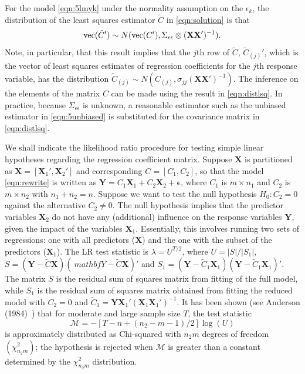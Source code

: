 \setcounter{result}{0}
\begin{result} \label{res:1}
For the model \eqref{eqn:5lmyk} under the normality assumption on the $\epsilon_k$,  the distribution of the least squares estimator $\tilde{C}$ in \eqref{eqn:solution} is that 
	\begin{equation} \label{eqn:distlsq}
	\tvec(\tilde{C}') \sim N(\tvec(C'), \Sigma_{\epsilon\epsilon} \otimes (\mathbf{X} \mathbf{X}')^{-1}).
	\end{equation}
Note, in particular, that this result implies that the $j$th row of $\tilde{C}$, $\tilde{C}_{(j)}'$, which is the vector of least squares estimates of regression coefficients for the $j$th response variable, has the distribution $\tilde{C}_{(j)} \sim N(C_{(j)}, \sigma_{jj}( \mathbf{X} \mathbf{X}')^{-1} )$. The inference on the elements of the matrix $C$ can be made using the result in \eqref{eqn:distlsq}. In practice, because $\Sigma_{\epsilon\epsilon}$ is unknown, a reasonable estimator such as the unbiased estimator in \eqref{eqn:5unbiased} is substituted for the covariance matrix in \eqref{eqn:distlsq}.


We shall indicate the likelihood ratio procedure for testing simple linear hypotheses regarding the regression coefficient matrix. Suppose $\mathbf{X}$ is partitioned as $\mathbf{X}= [\mathbf{X}_1', \mathbf{X}_2']$ and corresponding $C= [C_1, C_2]$, so that the model \eqref{eqn:rewrite} is written as $\mathbf{Y}= C_1 \mathbf{X}_1 + C_2 \mathbf{X}_2 + \mathbf{\epsilon}$, where $C_1$ is $m \times n_1$ and $C_2$ is $m \times n_2$ with $n_1 + n_2= n$. Suppose we want to test the null hypothesis $H_0: C_2= 0$ against the alternative $C_2 \neq 0$. The null hypothesis implies that the predictor variables $\mathbf{X}_2$ do not have any (additional) influence on the response variables $\mathbf{Y}$, given the impact of the variables $\mathbf{X}_1$. Essentially, this involves running two sets of regressions: one with all predictors ($\mathbf{X}$) and the one with the subset of the predictors ($\mathbf{X}_1$). The LR test statistic is $\lambda= U^{T/2}$, where $U= \lvert S\rvert / \lvert S_1 \rvert$, $S= (\mathbf{Y} - \tilde{C} \mathbf{X} )(\ mathbf{Y} - \tilde{C} \mathbf{X} )'$ and $S_1= (\mathbf{Y}-\tilde{C}_1 \mathbf{X}_1 )( \mathbf{Y} - \tilde{C}_1 \mathbf{X}_1 )'$. The matrix $S$ is the residual sum of squares matrix from fitting of the full model, while $S_1$ is the residual sum of squares matrix obtained from fitting the reduced model with $C_2=0$ and $\tilde{C}_1= \mathbf{Y} \mathbf{X}_1' (\mathbf{X}_1 \mathbf{X}_1')^{-1}$. It has been shown (see Anderson (1984)~\cite[Chap. 8]{andersontw2}) that for moderate and large sample size $T$, the test statistic 
	\begin{equation} \label{eqn:mathcal}
	\mathcal{M}= -[T - n + (n_2 - m - 1)/2] \log(U)
	\end{equation}
is approximately distributed as Chi-squared with $n_2 m$ degrees of freedom $(\chi_{n_2m}^2)$; the hypothesis is rejected when $\mathcal{M}$ is greater than a constant determined by the $\chi_{n_2m}^2$ distribution. 
\end{result}


